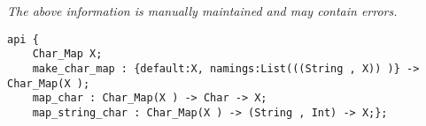 \label{api:Char\_Map}

{\tiny \it The above information is manually maintained and may contain errors.}
\begin{verbatim}
api {
    Char_Map X;
    make_char_map : {default:X, namings:List(((String , X)) )} -> Char_Map(X );
    map_char : Char_Map(X ) -> Char -> X;
    map_string_char : Char_Map(X ) -> (String , Int) -> X;};
\end{verbatim}
